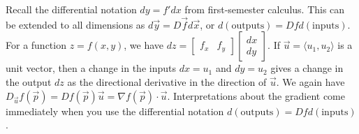 Recall the differential notation $dy=f' dx$ from first-semester
calculus.  This can be extended to all dimensions as $d\vec y=D\vec f
d\vec x$, or $d(\text{outputs}) =Df d(\text{inputs})$. For a function
$z=f(x,y)$, we have
$dz=\begin{bmatrix}f_x&f_y\end{bmatrix}\begin{bmatrix}dx\\dy\end{bmatrix}$.
If $\vec u =\langle u_1,u_2\rangle$ is a unit vector, then a change in the inputs
$dx=u_1$ and $dy=u_2$ gives a change in the output $dz$ as the
directional derivative in the direction of $\vec u$. We again have
$D_{\vec u} f (\vec p) = D f(\vec p)\vec u = \nabla f(\vec p)\cdot \vec u$.
Interpretations about the gradient come immediately when you use the
differential notation $d(\text{outputs}) =Df d(\text{inputs})$.



